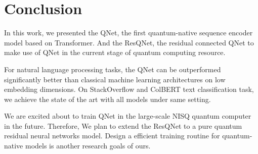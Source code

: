 \section{Conclusion}

In this work, we presented the QNet, the first quantum-native sequence encoder model based on Transformer. And the ResQNet, the residual connected QNet to make use of QNet in the current stage of quantum computing resource.

For natural language processing tasks, the QNet can be outperformed significantly better than classical machine learning architectures on low embedding dimensions. On StackOverflow and ColBERT text classification task, we achieve the state of the art with all models under same setting.

We are excited about to train QNet in the large-scale NISQ quantum computer in the future. Therefore, We plan to extend the ResQNet to a pure quantum residual neural networks model. Design a efficient training routine for quantum-native models is another research goals of ours.
